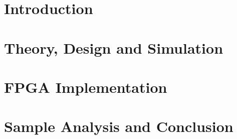 \documentclass[12pt, oneside, a4paper]{scrartcl}
\begin{document}
\newpage
\setcounter{tocdepth}{1}
\tableofcontents
\newpage
\part[Introduction]{Introduction}

\newpage
\part[Theory, Design and Simulation]{Theory, Design and Simulation}

\newpage
\part[FPGA Implementation]{FPGA Implementation}

\newpage
\part[Sample Analysis and Conclusion]{Sample Analysis and Conclusion}

\end{document}
